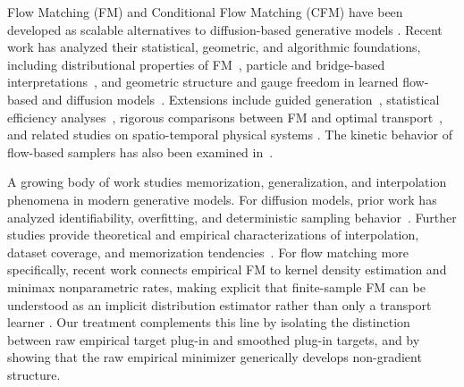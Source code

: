 \documentclass[a4paper,11pt]{article}
\theoremstyle{plain}
\theoremstyle{definition}
\begin{document}


Flow Matching (FM) \cite{lipman2022flow, lipman2024flow} and Conditional Flow Matching (CFM) \cite{tong2023improving} have been developed as scalable alternatives \cite{esser2024scaling} to diffusion-based generative models \cite{song2020score, lai2025principles}. Recent work has analyzed their statistical, geometric, and algorithmic foundations, including distributional properties of FM~\cite{kunkel2025distribution}, particle and bridge-based interpretations~\cite{bamberger2025carr}, and geometric structure and gauge freedom in learned flow-based and diffusion models~\cite{wanelucidating, horvat2024gauge}. Extensions include guided generation~\cite{feng2025guidance}, statistical efficiency analyses~\cite{mena2025statistical}, rigorous comparisons between FM and optimal transport~\cite{hertrich2025relation, wald2025flow}, and related studies on spatio-temporal physical systems \cite{lim2024elucidating, erichson2025flex}. The kinetic behavior of flow-based samplers has also been examined in~\cite{shaul2023kinetic, li2025enfopath, li2026kinetic}.


A growing body of work studies memorization, generalization, and interpolation phenomena in modern generative models. For diffusion models, prior work has analyzed identifiability, overfitting, and deterministic sampling behavior~\cite{pidstrigach2022score, yoon2023deterministic}. Further studies provide theoretical and empirical characterizations of interpolation, dataset coverage, and memorization tendencies~\cite{lyu2025resolving, scarvelis2023closed, baptista2025memorization, bertrand2025closed, chen2025interpolation}. For flow matching more specifically, recent work connects empirical FM to kernel density estimation and minimax nonparametric rates, making explicit that finite-sample FM can be understood as an implicit distribution estimator rather than only a transport learner \cite{kunkel2025minimax}. Our treatment complements this line by isolating the distinction between raw empirical target plug-in and smoothed plug-in targets, and by showing that the raw empirical minimizer generically develops non-gradient structure.
\end{document}

